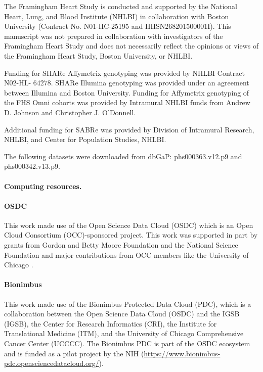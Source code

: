 \documentclass[10pt,letterpaper]{article}
\begin{document}
The Framingham Heart Study is conducted and supported by the National Heart, Lung, and Blood Institute (NHLBI) in collaboration with Boston University (Contract No. N01-HC-25195 and HHSN268201500001I). This manuscript was not prepared in collaboration with investigators of the Framingham Heart Study and does not necessarily reflect the opinions or views of the Framingham Heart Study, Boston University, or NHLBI.

Funding for SHARe Affymetrix genotyping was provided by NHLBI Contract N02-HL- 64278. SHARe Illumina genotyping was provided under an agreement between Illumina and Boston University. Funding for Affymetrix genotyping of the FHS Omni cohorts was provided by Intramural NHLBI funds from Andrew D. Johnson and Christopher J. O'Donnell.

Additional funding for SABRe was provided by Division of Intramural Research, NHLBI, and Center for Population Studies, NHLBI.

The following datasets were downloaded from dbGaP: phs000363.v12.p9 and phs000342.v13.p9.

\paragraph{Computing resources.}\label{computing-resources}

\paragraph{OSDC}

This work made use of the Open Science Data Cloud (OSDC) which is an
Open Cloud Consortium (OCC)-sponsored project. This work was supported
in part by grants from Gordon and Betty Moore Foundation and the
National Science Foundation and major contributions from OCC members
like the University of Chicago \cite{grossman2012design}.

\paragraph{Bionimbus}
This work made use of the
Bionimbus Protected Data Cloud (PDC), which is a collaboration between
the Open Science Data Cloud (OSDC) and the IGSB (IGSB), the Center for
Research Informatics (CRI), the Institute for Translational Medicine
(ITM), and the University of Chicago Comprehensive Cancer Center
(UCCCC). The Bionimbus PDC is part of the OSDC ecosystem and is funded
as a pilot project by the NIH \cite{heath2014bionimbus} (\url{https://www.bionimbus-pdc.opensciencedatacloud.org/}).
\end{document}
